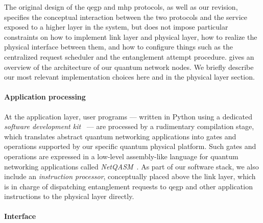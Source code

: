 The original design of the \acrshort{qegp} and \acrshort{mhp} protocols, as well as our revision,
specifies the conceptual interaction between the two protocols and the service exposed to a higher
layer in the system, but does not impose particular constraints on how to implement link layer and
physical layer, how to realize the physical interface between them, and how to configure things such
as the centralized request scheduler and the entanglement attempt procedure. 
gives an overview of the architecture of our quantum network nodes. We briefly describe our most
relevant implementation choices here and in the physical layer section.

\paragraph{Application processing}

At the application layer, user programs --- written in Python using a dedicated \emph{software
development kit}~\cite{netqasm_sdk} --- are processed by a rudimentary compilation stage, which
translates abstract quantum networking applications into gates and operations supported by our
specific quantum physical platform. Such gates and operations are expressed in a low-level
assembly-like language for quantum networking applications called
\emph{NetQASM}~\cite{dahlberg_2022_netqasm}. As part of our software stack, we also include an
\emph{instruction processor}, conceptually placed above the link layer, which is in charge of
dispatching entanglement requests to \acrshort{qegp} and other application instructions to the
physical layer directly.

\paragraph{Interface}


